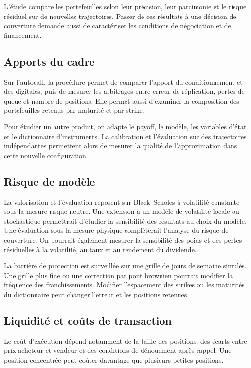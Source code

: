 \documentclass[12pt,a4paper]{article}
\newcommand{\1}{\mathbf{1}}
\begin{document}
L’étude compare les portefeuilles selon leur précision, leur parcimonie et le risque résiduel sur de nouvelles trajectoires. Passer de ces résultats à une décision de couverture demande aussi de caractériser les conditions de négociation et de financement.

\subsection{Apports du cadre}

Sur l’autocall, la procédure permet de comparer l’apport du conditionnement et des digitales, puis de mesurer les arbitrages entre erreur de réplication, pertes de queue et nombre de positions. Elle permet aussi d’examiner la composition des portefeuilles retenus par maturité et par strike.

Pour étudier un autre produit, on adapte le payoff, le modèle, les variables d’état et le dictionnaire d’instruments. La calibration et l’évaluation sur des trajectoires indépendantes permettent alors de mesurer la qualité de l’approximation dans cette nouvelle configuration.

\subsection{Risque de modèle}

La valorisation et l’évaluation reposent sur Black--Scholes à volatilité constante sous la mesure risque-neutre. Une extension à un modèle de volatilité locale ou stochastique permettrait d’étudier la sensibilité des résultats au choix du modèle. Une évaluation sous la mesure physique compléterait l’analyse du risque de couverture. On pourrait également mesurer la sensibilité des poids et des pertes résiduelles à la volatilité, au taux et au rendement du dividende.

La barrière de protection est surveillée sur une grille de jours de semaine simulés. Une grille plus fine ou une correction par pont brownien pourrait modifier la fréquence des franchissements. Modifier l’espacement des strikes ou les maturités du dictionnaire peut changer l’erreur et les positions retenues.

\subsection{Liquidité et coûts de transaction}

Le coût d’exécution dépend notamment de la taille des positions, des écarts entre prix acheteur et vendeur et des conditions de dénouement après rappel. Une position concentrée peut coûter davantage que plusieurs petites positions.
\end{document}
